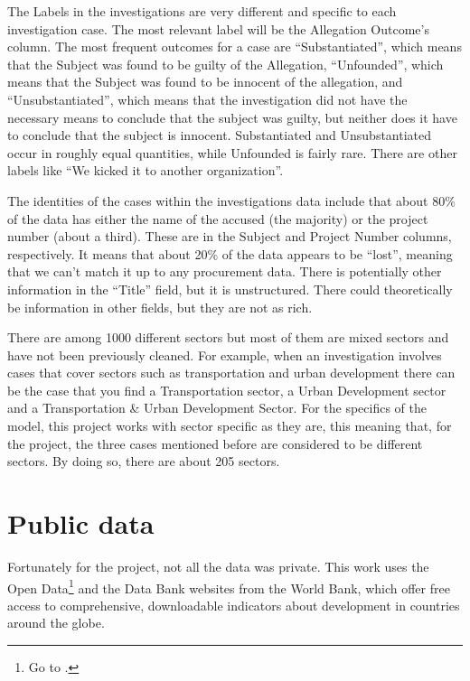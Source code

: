 The Labels in the investigations are very different and specific to each investigation case. The most relevant label will be the Allegation Outcome's column. The most frequent outcomes for a case are ``Substantiated'', which means that the Subject was found to be guilty of the Allegation, ``Unfounded'', which means that the Subject was found to be  innocent of the allegation, and ``Unsubstantiated'', which means that the investigation did not have the necessary means to conclude that the subject was  guilty, but neither does it have to conclude that the subject is innocent. Substantiated and Unsubstantiated occur in roughly equal quantities, while Unfounded is fairly rare. There are other labels like ``We kicked it to another organization''.

The identities of the cases within the investigations data include that about 80\% of the data has either the name of the accused (the majority) or the project number (about a third). These are in the Subject and Project Number columns, respectively. It means that about 20\% of the data appears to be ``lost'', meaning that we can't match it up to any procurement data. There is potentially other information in the ``Title'' field, but it is unstructured. There could theoretically be information in other fields, but they are not as rich.

There are among 1000 different sectors but most of them are mixed sectors and have not been previously cleaned. For example, when an investigation involves cases that cover sectors such as transportation and urban development there can be the case that you find a Transportation sector, a Urban Development sector and a Transportation \& Urban Development Sector. For the specifics of the model, this project works with sector specific as they are, this meaning that, for the project, the three cases mentioned before are considered to be different sectors. By doing so, there are about 205 sectors.


\section{Public data}\label{sec_public_data}



Fortunately for the project, not all the data was private. This work uses the Open Data\footnote{Go to \cite{wb_data}.}  and the Data Bank websites from the World Bank, which offer free access to comprehensive, downloadable indicators about development in countries around the globe. 

